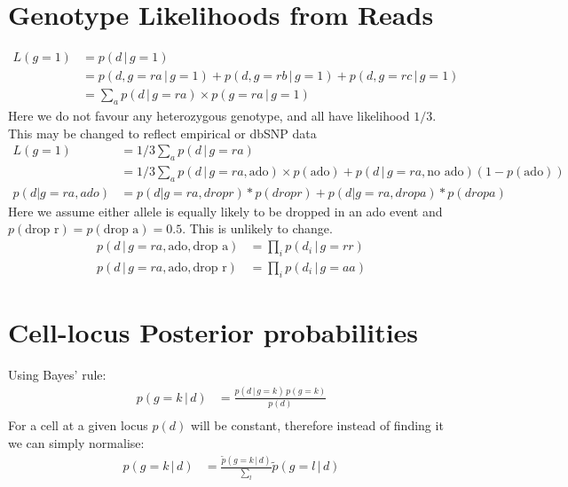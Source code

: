\documentclass{article}
\begin{document}
\section{Genotype Likelihoods from Reads}
\begin{align*}
L(g=1) &= p(d\,|\,g=1)\\
&=p(d, g=ra \,|\, g=1) + p(d, g=rb \,|\, g=1) + p(d, g=rc \,|\, g=1)\\
&= \sum_a p(d \,|\, g=ra) \times p(g=ra \,|\, g=1)
\end{align*}
Here we do not favour any heterozygous genotype, and all have likelihood $1/3$. This may be changed to reflect empirical or dbSNP data
\begin{align*}
L(g=1) &= 1/3 \sum_a p(d \,|\, g=ra)\\
&= 1/3 \sum_a p(d \,|\, g=ra, \text{ado}) \times p(\text{ado}) + p(d \,|\, g=ra, \text{no ado})(1-p(\text{ado}))\\
p(d|g=ra, ado) &= p(d|g=ra, drop r) * p(drop r) + p(d|g=ra, drop a) * p(drop a)
\end{align*}
Here we assume either allele is equally likely to be dropped in an ado event and $p(\text{drop r}) = p(\text{drop a}) = 0.5$. This is unlikely to change.
\begin{align*}
p(d \,|\, g=ra, \text{ado}, \text{drop a}) &= \prod_i p(d_i \,|\, g=rr)\\
p(d \,|\, g=ra, \text{ado}, \text{drop r}) &= \prod_i p(d_i \,|\, g=aa)
\end{align*}

\section{Cell-locus Posterior probabilities}
Using Bayes' rule:
\begin{align*}
p(g=k\,|\, d) &= \frac{p(d\,|\,g=k)\,p(g=k)}{p(d)}\\
\end{align*}
For a cell at a given locus $p(d)$ will be constant, therefore instead of finding it we can simply normalise:
\begin{align*}
p(g=k\,|\,d) &= \frac{\tilde{p}(g=k\,|\,d)}{\sum_l}\tilde{p}(g=l\,|\,d)\\
\end{align*}
\end{document}
